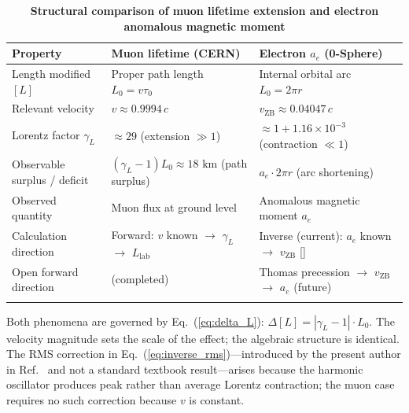 \documentclass[%
 reprint, amsmath,amssymb, aps, prb, ]{revtex4-2}
\numberwithin{equation}{section}
\newcommand{\vZB}{v_{\text{ZB}}}
\newcommand{\gammaL}{\gamma_{L}}
\begin{document}
\begin{table}[t!]
\centering
\caption{\textbf{Structural comparison of muon lifetime extension and electron anomalous magnetic moment}}
\label{tab:comparison}
\renewcommand{\arraystretch}{1.4}
\begin{tabular}{p{4.8cm}p{5.2cm}p{6.2cm}}
\toprule
\textbf{Property}
& \textbf{Muon lifetime (CERN)}
& \textbf{Electron $a_e$ (0-Sphere)} \\
\midrule
Length modified $[L]$
& Proper path length $L_0 = v\tau_0$
& Internal orbital arc $L_0 = 2\pi r$ \\
\addlinespace[0.3cm]
Relevant velocity
& $v \approx 0.9994\,c$
& $\vZB \approx 0.04047\,c$ \\
\addlinespace[0.3cm]
Lorentz factor $\gammaL$
& $\approx 29$ (extension $\gg 1$)
& $\approx 1 + 1.16\times10^{-3}$ (contraction $\ll 1$) \\
\addlinespace[0.3cm]
Observable surplus / deficit
& $(\gammaL-1)L_0 \approx 18\text{ km}$ (path surplus)
& $a_e \cdot 2\pi r$ (arc shortening) \\
\addlinespace[0.3cm]
Observed quantity
& Muon flux at ground level~\cite{Bailey1977}
& Anomalous magnetic moment $a_e$~\cite{Hanneke2008} \\
\addlinespace[0.3cm]
Calculation direction
& Forward: $v$ known $\to$ $\gammaL$ $\to$ $L_{\text{lab}}$
& Inverse (current): $a_e$ known $\to$ $\vZB$ [\cite{Hanamura_2023_10}] \\
\addlinespace[0.3cm]
Open forward direction
& (completed)
& Thomas precession $\to$ $\vZB$ $\to$ $a_e$ (future) \\
\addlinespace[0.2cm]
\bottomrule
\end{tabular}
\vspace{0.2cm}
\begin{minipage}{0.95\textwidth}
\justifying\footnotesize
Both phenomena are governed by Eq.~(\ref{eq:delta_L}): $\Delta[L] = |\gammaL - 1|\cdot L_0$. The velocity magnitude sets the scale of the effect; the algebraic structure is identical. The RMS correction in Eq.~(\ref{eq:inverse_rms})---introduced by the present author in Ref.~\cite{Hanamura_2023_10} and not a standard textbook result---arises because the harmonic oscillator produces peak rather than average Lorentz contraction; the muon case requires no such correction because $v$ is constant.
\end{minipage}
\end{table}
\end{document}
